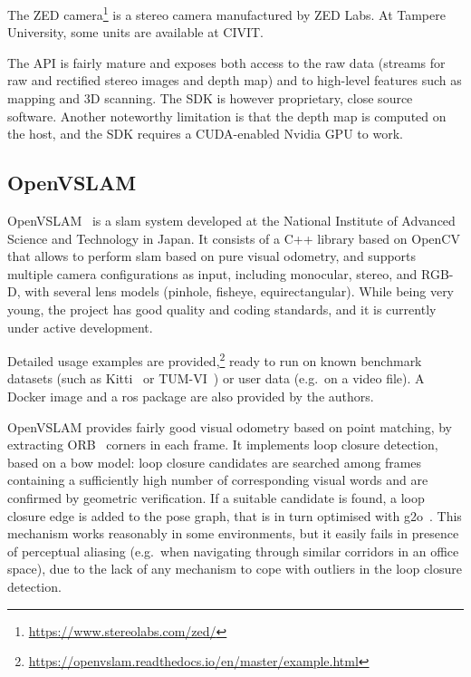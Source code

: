 \documentclass[11pt, letterpaper, twoside]{article}
\begin{document}
The ZED camera\footnote{\url{https://www.stereolabs.com/zed/}} is a stereo
camera manufactured by ZED Labs. At Tampere University, some units are
available at CIVIT.

The API is fairly mature and exposes both access to the raw data (streams for
raw and rectified stereo images and depth map) and to high-level features such
as mapping and 3D scanning. The SDK is however proprietary, close source
software. Another noteworthy limitation is that the depth map is computed on
the host, and the SDK requires a CUDA-enabled Nvidia GPU to work.

\subsection{OpenVSLAM}

OpenVSLAM~\cite{openvslam2019} is a \gls{slam} system developed at the National
Institute of Advanced Science and Technology in Japan. It consists of a C++
library based on OpenCV that allows to perform \gls{slam} based on pure visual
odometry, and supports multiple camera configurations as input, including
monocular, stereo, and RGB-D, with several lens models (pinhole, fisheye,
equirectangular). While being very young, the project has good quality and
coding standards, and it is currently under active development.

Detailed usage examples are
provided,\footnote{\url{https://openvslam.readthedocs.io/en/master/example.html}}
ready to run on known benchmark datasets (such as Kitti~\cite{geiger2013vision}
or TUM-VI~\cite{schubert2018vidataset}) or user data (e.g.\ on a video file). A
Docker image and a \gls{ros} package are also provided by the authors.

OpenVSLAM provides fairly good visual odometry based on point matching, by
extracting ORB~\cite{rublee2011orb} corners in each frame. It implements loop
closure detection, based on a \gls{bow} model: loop closure candidates are
searched among frames containing a sufficiently high number of corresponding
visual words and are confirmed by geometric verification. If a suitable
candidate is found, a loop closure edge is added to the pose graph, that is in
turn optimised with g2o~\cite{grisetti2011g2o}. This mechanism works reasonably
in some environments, but it easily fails in presence of perceptual aliasing
(e.g.\ when navigating through similar corridors in an office space), due to
the lack of any mechanism to cope with outliers in the loop closure detection.
\end{document}
